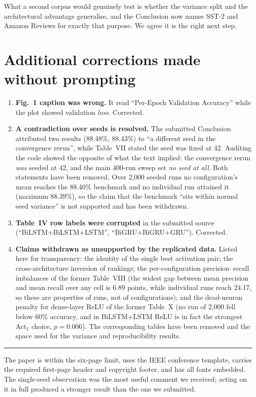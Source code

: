 \documentclass[10pt,a4paper]{article}
\newcommand{\pt}[1]{\textbf{#1}}
\begin{document}
What a second corpus would genuinely test is whether the variance
split and the architectural advantage generalise, and the
Conclusion now names SST-2 and Amazon Reviews for exactly that
purpose. We agree it is the right next step.

\section*{Additional corrections made without prompting}

\begin{enumerate}[leftmargin=1.6em,itemsep=2pt]
  \item \pt{Fig.~1 caption was wrong.} It read ``Per-Epoch
  Validation Accuracy'' while the plot showed validation
  \emph{loss}. Corrected.

  \item \pt{A contradiction over seeds is resolved.} The submitted
  Conclusion attributed two results (88.48\%, 88.43\%) to ``a
  different seed in the convergence rerun'', while Table~VII stated
  the seed was fixed at 42. Auditing the code showed the opposite
  of what the text implied: the convergence rerun \emph{was} seeded
  at 42, and the main 400-run sweep set \emph{no seed at all}. Both
  statements have been removed. Over 2{,}000 seeded runs no
  configuration's mean reaches the 88.40\% benchmark and no
  individual run attained it (maximum 88.39\%), so the claim that
  the benchmark ``sits within normal seed variance'' is not
  supported and has been withdrawn.

  \item \pt{Table~IV row labels were corrupted} in the submitted
  source (``BiLSTM+BiLSTM+LSTM'', ``BiGRU+BiGRU+GRU''). Corrected.

  \item \pt{Claims withdrawn as unsupported by the replicated
  data.} Listed here for transparency: the identity of the single
  best activation pair; the cross-architecture inversion of
  rankings; the per-configuration precision--recall imbalances of
  the former Table~VIII (the widest gap between mean precision and
  mean recall over any cell is 6.89 points, while individual runs
  reach 24.17, so these are properties of runs, not of
  configurations); and the dead-neuron penalty for dense-layer
  ReLU of the former Table~X (no run of 2{,}000 fell below 60\%
  accuracy, and in BiLSTM+LSTM ReLU is in fact the strongest
  Act$_1$ choice, $p=0.006$). The corresponding tables have been
  removed and the space used for the variance and reproducibility
  results.
\end{enumerate}

\vspace{0.5em}
\noindent\rule{\textwidth}{0.4pt}

The paper is within the six-page limit, uses the IEEE conference
template, carries the required first-page header and copyright
footer, and has all fonts embedded. The single-seed observation was
the most useful comment we received; acting on it in full produced
a stronger result than the one we submitted.
\end{document}

